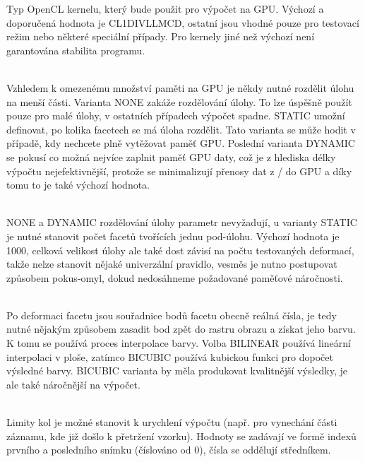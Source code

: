 \documentclass[a4paper,12pt]{article}
\begin{document}
\begin{description}
Typ OpenCL kernelu, který bude použit pro výpočet na GPU. Výchozí a doporučená hodnota je CL\textunderscore 1D\textunderscore I\textunderscore V\textunderscore LL\textunderscore MC\textunderscore D, ostatní jsou vhodné pouze pro testovací režim nebo některé speciální případy. Pro kernely jiné než výchozí není garantována stabilita programu.
\item[TASK\textunderscore SPLIT\textunderscore METHOD] [NONE | STATIC | \textbf{DYNAMIC}]\\
Vzhledem k omezenému množství paměti na GPU je někdy nutné rozdělit úlohu na menší části. Varianta NONE zakáže rozdělování úlohy. To lze úspěšně použít pouze pro malé úlohy, v ostatních případech výpočet spadne. STATIC umožní definovat, po kolika facetech se má úloha rozdělit. Tato varianta se může hodit v případě, kdy nechcete plně vytěžovat paměť GPU. Poslední varianta DYNAMIC se pokusí co možná nejvíce zaplnit paměť GPU daty, což je z hlediska délky výpočtu nejefektivnější, protože se minimalizují přenosy dat z / do GPU a díky tomu to je také výchozí hodnota.
\item[TASK\textunderscore SPLIT\textunderscore PARAM] [int]\\
NONE a DYNAMIC rozdělování úlohy parametr nevyžadují, u varianty STATIC je nutné stanovit počet facetů tvořících jednu pod-úlohu. Výchozí hodnota je 1000, celková velikost úlohy ale také dost závisí na počtu testovaných deformací, takže nelze stanovit nějaké univerzální pravidlo, vesměs je nutno postupovat způsobem pokus-omyl, dokud nedosáhneme požadované paměťové náročnosti.
\item[INTERPOLATION] [BILINEAR | \textbf{BICUBIC}]\\
Po deformaci facetu jsou souřadnice bodů facetu obecně reálná čísla, je tedy nutné nějakým způsobem zasadit bod zpět do rastru obrazu a získat jeho barvu. K tomu se používá proces interpolace barvy. Volba BILINEAR používá lineární interpolaci v ploše, zatímco BICUBIC používá kubickou funkci pro dopočet výsledné barvy. BICUBIC varianta by měla produkovat kvalitnější výsledky, je ale také náročnější na výpočet.
\item[ROUND\textunderscore LIMITS] [int ; int]\\
Limity kol je možné stanovit k urychlení výpočtu (např. pro vynechání části záznamu, kde již došlo k přetržení vzorku). Hodnoty se zadávají ve formě indexů prvního a posledního snímku (číslováno od 0), čísla se oddělují středníkem.
\item[RESULT\textunderscore QUALITY] [double]\\

\end{description}
\end{document}
